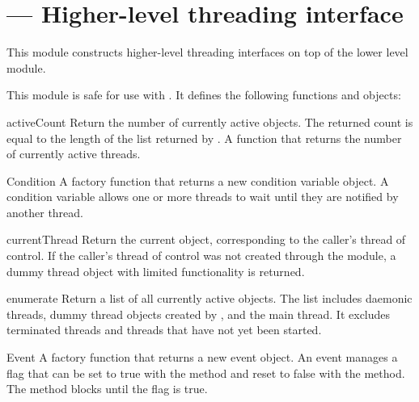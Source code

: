 \section{ ---
         Higher-level threading interface}



This module constructs higher-level threading interfaces on top of the 
lower level  module.

This module is safe for use with .  It
defines the following functions and objects:

\begin{funcdesc}{activeCount}{}
Return the number of currently active  objects.
The returned count is equal to the length of the list returned by
.
A function that returns the number of currently active threads.
\end{funcdesc}

\begin{funcdesc}{Condition}{}
A factory function that returns a new condition variable object.
A condition variable allows one or more threads to wait until they
are notified by another thread.
\end{funcdesc}

\begin{funcdesc}{currentThread}{}
Return the current  object, corresponding to the
caller's thread of control.  If the caller's thread of control was not
created through the
 module, a dummy thread object with limited functionality
is returned.
\end{funcdesc}

\begin{funcdesc}{enumerate}{}
Return a list of all currently active  objects.
The list includes daemonic threads, dummy thread objects created
by , and the main thread.  It excludes terminated
threads and threads that have not yet been started.
\end{funcdesc}

\begin{funcdesc}{Event}{}
A factory function that returns a new event object.  An event
manages a flag that can be set to true with the  method and
reset to false with the  method.  The  method blocks
until the flag is true.
\end{funcdesc}

